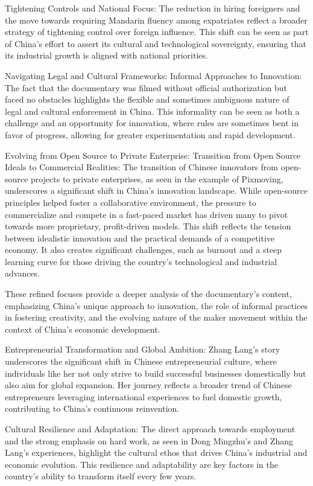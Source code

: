 Tightening Controls and National Focus: The reduction in hiring foreigners and the move towards requiring Mandarin fluency among expatriates reflect a broader strategy of tightening control over foreign influence. This shift can be seen as part of China’s effort to assert its cultural and technological sovereignty, ensuring that its industrial growth is aligned with national priorities.


Navigating Legal and Cultural Frameworks:
Informal Approaches to Innovation: The fact that the documentary was filmed without official authorization but faced no obstacles highlights the flexible and sometimes ambiguous nature of legal and cultural enforcement in China. This informality can be seen as both a challenge and an opportunity for innovation, where rules are sometimes bent in favor of progress, allowing for greater experimentation and rapid development.


Evolving from Open Source to Private Enterprise:
Transition from Open Source Ideals to Commercial Realities: The transition of Chinese innovators from open-source projects to private enterprises, as seen in the example of Pixmoving, underscores a significant shift in China’s innovation landscape. While open-source principles helped foster a collaborative environment, the pressure to commercialize and compete in a fast-paced market has driven many to pivot towards more proprietary, profit-driven models. This shift reflects the tension between idealistic innovation and the practical demands of a competitive economy. It also creates significant challenges, such as burnout and a steep learning curve for those driving the country's technological and industrial advances.


These refined focuses provide a deeper analysis of the documentary’s content, emphasizing China’s unique approach to innovation, the role of informal practices in fostering creativity, and the evolving nature of the maker movement within the context of China's economic development.


Entrepreneurial Transformation and Global Ambition: Zhang Lang’s story underscores the significant shift in Chinese entrepreneurial culture, where individuals like her not only strive to build successful businesses domestically but also aim for global expansion. Her journey reflects a broader trend of Chinese entrepreneurs leveraging international experiences to fuel domestic growth, contributing to China's continuous reinvention.


Cultural Resilience and Adaptation: The direct approach towards employment and the strong emphasis on hard work, as seen in Dong Mingzhu’s and Zhang Lang’s experiences, highlight the cultural ethos that drives China's industrial and economic evolution. This resilience and adaptability are key factors in the country's ability to transform itself every few years.


